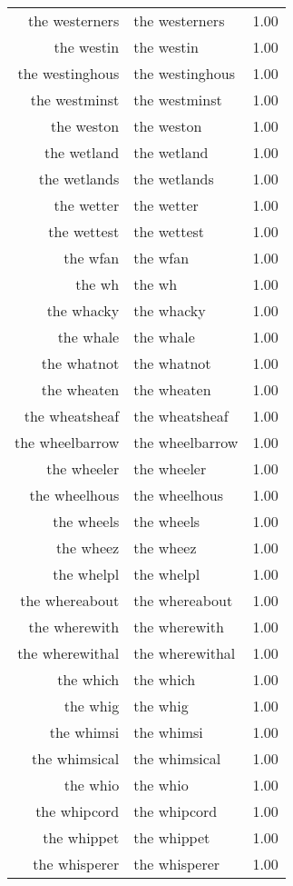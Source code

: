 \begin{table}[ht]
\begin{tabular}{rlr}
  the westerners & the westerners & 1.00 \\ 
  the westin & the westin & 1.00 \\ 
  the westinghous & the westinghous & 1.00 \\ 
  the westminst & the westminst & 1.00 \\ 
  the weston & the weston & 1.00 \\ 
  the wetland & the wetland & 1.00 \\ 
  the wetlands & the wetlands & 1.00 \\ 
  the wetter & the wetter & 1.00 \\ 
  the wettest & the wettest & 1.00 \\ 
  the wfan & the wfan & 1.00 \\ 
  the wh & the wh & 1.00 \\ 
  the whacky & the whacky & 1.00 \\ 
  the whale & the whale & 1.00 \\ 
  the whatnot & the whatnot & 1.00 \\ 
  the wheaten & the wheaten & 1.00 \\ 
  the wheatsheaf & the wheatsheaf & 1.00 \\ 
  the wheelbarrow & the wheelbarrow & 1.00 \\ 
  the wheeler & the wheeler & 1.00 \\ 
  the wheelhous & the wheelhous & 1.00 \\ 
  the wheels & the wheels & 1.00 \\ 
  the wheez & the wheez & 1.00 \\ 
  the whelpl & the whelpl & 1.00 \\ 
  the whereabout & the whereabout & 1.00 \\ 
  the wherewith & the wherewith & 1.00 \\ 
  the wherewithal & the wherewithal & 1.00 \\ 
  the which & the which & 1.00 \\ 
  the whig & the whig & 1.00 \\ 
  the whimsi & the whimsi & 1.00 \\ 
  the whimsical & the whimsical & 1.00 \\ 
  the whio & the whio & 1.00 \\ 
  the whipcord & the whipcord & 1.00 \\ 
  the whippet & the whippet & 1.00 \\ 
  the whisperer & the whisperer & 1.00 \\ 

\end{tabular}
\end{table}
